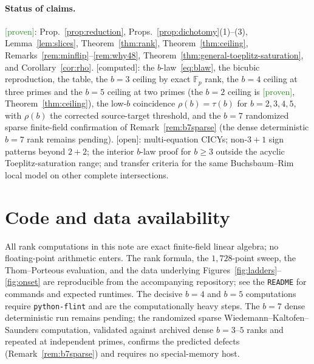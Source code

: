 \documentclass[11pt]{article}
\theoremstyle{plain}
\theoremstyle{definition}
\theoremstyle{remark}
\newcommand{\Proven}{\textcolor{ForestGreen}{\textsf{[proven]}}}
\newcommand{\Computed}{\textcolor{Sepia}{\textsf{[computed]}}}
\newcommand{\Open}{\textcolor{BrickRed}{\textsf{[open]}}}
\begin{document}
\paragraph{Status of claims.}
\Proven: Prop.~\ref{prop:reduction}, Props.~\ref{prop:dichotomy}(1)--(3), Lemma~\ref{lem:slices}, Theorem~\ref{thm:rank}, Theorem~\ref{thm:ceiling}, Remarks~\ref{rem:minflip}--\ref{rem:why48}, Theorem~\ref{thm:general-toeplitz-saturation}, and Corollary~\ref{cor:rho}.\quad
\Computed: the $b$-law~\eqref{eq:blaw}, the bicubic reproduction, the table, the $b=3$ ceiling by exact $\mathbb{F}_p$ rank, the $b=4$ ceiling at three primes and the $b=5$ ceiling at two primes (the $b=2$ ceiling is \Proven, Theorem~\ref{thm:ceiling}), the low-$b$ coincidence $\rho(b)=\tau(b)$ for $b=2,3,4,5$, with $\rho(b)$ the corrected source-target threshold, and the $b=7$ randomized sparse finite-field confirmation of Remark~\ref{rem:b7sparse} (the dense deterministic $b=7$ rank remains pending).\quad
\Open: multi-equation CICYs; non-$3{+}1$ sign patterns beyond $2{+}2$; the interior $b$-law proof for $b\ge3$ outside the acyclic Toeplitz-saturation range; and transfer criteria for the same Buchsbaum--Rim local model on other complete intersections.

\section*{Code and data availability}
All rank computations in this note are exact finite-field linear algebra; no floating-point arithmetic enters. The rank formula, the $1{,}728$-point sweep, the Thom--Porteous evaluation, and the data underlying Figures~\ref{fig:ladders}--\ref{fig:onset} are reproducible from the accompanying repository; see the \texttt{README} for commands and expected runtimes. The decisive $b=4$ and $b=5$ computations require \texttt{python-flint} and are the computationally heavy steps. The $b=7$ dense deterministic run remains pending; the randomized sparse Wiedemann--Kaltofen--Saunders computation, validated against archived dense $b=3$--$5$ ranks and repeated at independent primes, confirms the predicted defects (Remark~\ref{rem:b7sparse}) and requires no special-memory host.
\end{document}
